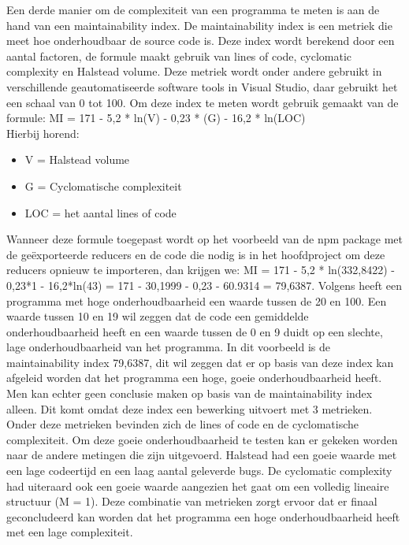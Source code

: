 Een derde manier om de complexiteit van een programma te meten is aan de hand van een maintainability index. De maintainability index is een metriek  die meet hoe onderhoudbaar de source code is. Deze index wordt berekend door een aantal factoren, de formule maakt gebruik van lines of code, cyclomatic complexity en Halstead volume. Deze metriek wordt onder andere gebruikt in verschillende geautomatiseerde software tools in Visual Studio, daar gebruikt het een schaal van 0 tot 100.
Om deze index te meten wordt gebruik gemaakt van de formule: \newline MI = 171 - 5,2 * ln(V) - 0,23 * (G) - 16,2 * ln(LOC) \\
Hierbij horend: 
\begin{itemize}
	\item V = Halstead volume
	\item G = Cyclomatische complexiteit
	\item LOC = het aantal lines of code
\end{itemize}
\autocite{maintainability01}\newline\newline
Wanneer deze formule toegepast wordt op het voorbeeld van de npm package met de geëxporteerde reducers en de code die nodig is in het hoofdproject om deze reducers opnieuw te importeren, dan krijgen we: \newline
MI = 171 - 5,2 * ln(332,8422) - 0,23*1 - 16,2*ln(43) = 171 - 30,1999 - 0,23 - 60.9314 = 79,6387. \newline
Volgens \textcite{maintainability02} heeft een programma met hoge onderhoudbaarheid een waarde tussen de 20 en 100. Een waarde tussen 10 en 19 wil zeggen dat de code een gemiddelde onderhoudbaarheid heeft en een waarde tussen de 0 en 9 duidt op een slechte, lage onderhoudbaarheid van het programma. In dit voorbeeld is de maintainability index 79,6387, dit wil zeggen dat er op basis van deze index kan afgeleid worden dat het programma een hoge, goeie onderhoudbaarheid heeft. Men kan echter geen conclusie maken op basis van de maintainability index alleen. Dit komt omdat deze index een bewerking uitvoert met 3 metrieken. Onder deze metrieken bevinden zich de lines of code en de cyclomatische complexiteit. Om deze goeie onderhoudbaarheid te testen kan er gekeken worden naar de andere metingen die zijn uitgevoerd.  Halstead had een goeie waarde met een lage codeertijd en een laag aantal geleverde bugs. De cyclomatic complexity had uiteraard ook een goeie waarde aangezien het gaat om een volledig lineaire structuur (M = 1). Deze combinatie van metrieken zorgt ervoor dat er finaal geconcludeerd kan worden dat het programma een hoge onderhoudbaarheid heeft met een lage complexiteit. 

